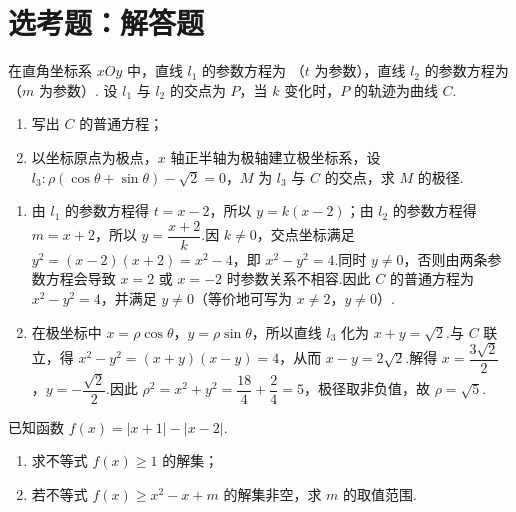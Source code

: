\section{选考题：解答题}

\begin{problem}
在直角坐标系 \(xOy\) 中，直线 \(l_1\) 的参数方程为
（\(t\) 为参数），直线 \(l_2\) 的参数方程为
（\(m\) 为参数）. 设 \(l_1\) 与 \(l_2\) 的交点为 \(P\)，当 \(k\) 变化时，\(P\) 的轨迹为曲线 \(C\).

\begin{enumerate}
\item 写出 \(C\) 的普通方程；
\item 以坐标原点为极点，\(x\) 轴正半轴为极轴建立极坐标系，设 \(l_3:\rho(\cos\theta+\sin\theta)-\sqrt2=0\)，\(M\) 为 \(l_3\) 与 \(C\) 的交点，求 \(M\) 的极径.
\end{enumerate}
\end{problem}

\begin{solution}
\begin{enumerate}
\item 由 \(l_1\) 的参数方程得 \(t=x-2\)，所以 \(y=k(x-2)\)；由 \(l_2\) 的参数方程得 \(m=x+2\)，所以 \(y=\dfrac{x+2}{k}\).因 \(k\ne0\)，交点坐标满足
\(y^2=(x-2)(x+2)=x^2-4\)，即 \(x^2-y^2=4\).同时 \(y\ne0\)，否则由两条参数方程会导致 \(x=2\) 或 \(x=-2\) 时参数关系不相容.因此 \(C\) 的普通方程为 \(x^2-y^2=4\)，并满足 \(y\ne0\)（等价地可写为 \(x\ne2\)，\(y\ne0\)）.
\item 在极坐标中 \(x=\rho\cos\theta\)，\(y=\rho\sin\theta\)，所以直线 \(l_3\) 化为 \(x+y=\sqrt2\).与 \(C\) 联立，得
\(x^2-y^2=(x+y)(x-y)=4\)，从而 \(x-y=2\sqrt2\).解得
\(x=\dfrac{3\sqrt2}{2}\)，\(y=-\dfrac{\sqrt2}{2}\).因此
\(\rho^2=x^2+y^2=\dfrac{18}{4}+\dfrac{2}{4}=5\)，极径取非负值，故 \(\rho=\sqrt5\).
\end{enumerate}
\end{solution}

\begin{problem}
已知函数 \(f(x)=|x+1|-|x-2|\).

\begin{enumerate}
\item 求不等式 \(f(x)\ge 1\) 的解集；
\item 若不等式 \(f(x)\ge x^2-x+m\) 的解集非空，求 \(m\) 的取值范围.
\end{enumerate}
\end{problem}

